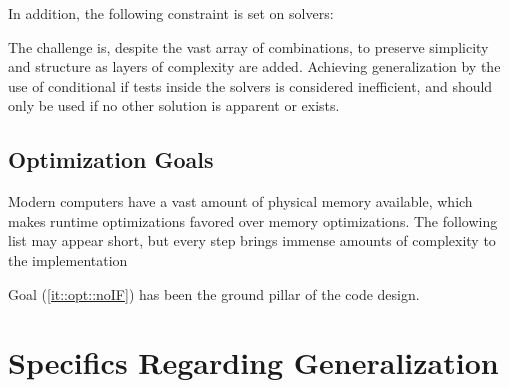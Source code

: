 In addition, the following constraint is set on solvers:


The challenge is, despite the vast array of combinations, to preserve simplicity and structure as layers of complexity are added. Achieving generalization by the use of conditional if tests inside the solvers is considered inefficient, and should only be used if no other solution is apparent or exists.

\subsection{Optimization Goals}
\label{sec:optGoals}

Modern computers have a vast amount of physical memory available, which makes runtime optimizations favored over memory optimizations. The following list may appear short, but every step brings immense amounts of complexity to the implementation


Goal (\ref{it::opt::noIF}) has been the ground pillar of the code design. 

\clearpage
\section{Specifics Regarding Generalization}
\label{sec:specGen}

